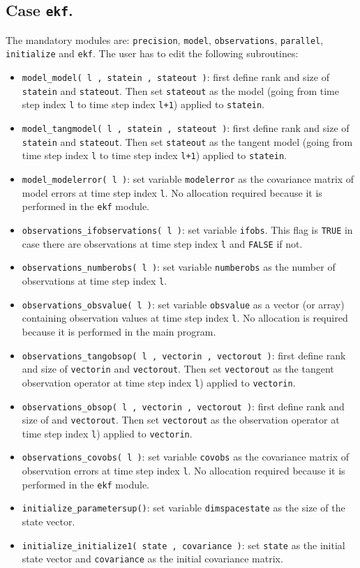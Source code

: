 \documentclass[12pt]{article}
\begin{document}
\subsection{Case {\tt ekf}.}
The mandatory modules are: {\tt precision}, {\tt model}, {\tt observations}, {\tt parallel}, {\tt initialize} and {\tt ekf}. The user has to edit the following subroutines:
\begin{itemize}
\item {\tt model\_model( l , statein , stateout )}: first define rank and size of {\tt statein} and {\tt stateout}. Then set {\tt stateout} as the model (going from  time step index {\tt l} to time step index {\tt l+1}) applied to {\tt statein}. 
\item {\tt model\_tangmodel( l , statein , stateout )}: first define rank and size of {\tt statein} and {\tt stateout}. Then set {\tt stateout} as the tangent model (going from  time step index {\tt l} to time step index {\tt l+1}) applied to {\tt statein}. 
\item {\tt model\_modelerror( l )}: set variable {\tt modelerror} as the covariance matrix of model errors at time step index {\tt l}. No allocation required because it is performed in the {\tt ekf} module.
\item {\tt observations\_ifobservations( l )}: set variable {\tt ifobs}. This flag is {\tt TRUE} in case there are observations at time step index {\tt l} and {\tt FALSE} if not.
\item {\tt observations\_numberobs( l )}: set variable {\tt numberobs} as the number of observations at time step index {\tt l}.
\item {\tt observations\_obsvalue( l )}: set variable {\tt obsvalue} as a vector (or array) containing observation values at time step index {\tt l}. No allocation is required because it is performed in the main program.
\item {\tt observations\_tangobsop( l , vectorin , vectorout )}: first define rank and size of {\tt vectorin} and {\tt vectorout}. Then set {\tt vectorout} as the tangent observation operator at time step index {\tt l}) applied to {\tt vectorin}. 
\item {\tt observations\_obsop( l , vectorin , vectorout )}: first define rank and size of  and {\tt vectorout}. Then set {\tt vectorout} as the observation operator at time step index {\tt l}) applied to {\tt vectorin}. 
\item {\tt observations\_covobs( l )}: set variable {\tt covobs} as the covariance matrix of observation errors at time step index {\tt l}. No allocation required because it is performed in the {\tt ekf} module.
\item {\tt initialize\_parametersup()}: set variable {\tt dimspacestate} as the size of the state vector.
\item {\tt initialize\_initialize1( state , covariance )}: set {\tt state} as the initial state vector and {\tt covariance} as the initial covariance matrix.
\end{itemize}
\end{document}
